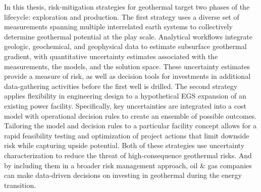 In this thesis, risk-mitigation strategies for geothermal target two phases of the lifecycle: exploration and production. The first strategy uses a diverse set of measurements spanning multiple interrelated earth systems to collectively determine geothermal potential at the play scale. Analytical workflows integrate geologic, geochemical, and geophysical data to estimate subsurface geothermal gradient, with quantitative uncertainty estimates associated with the measurements, the models, and the solution space. These uncertainty estimates provide a measure of risk, as well as decision tools for investments in additional data-gathering activities before the first well is drilled. The second strategy applies flexibility in engineering design to a hypothetical EGS expansion of an existing power facility. Specifically, key uncertainties are integrated into a cost model with operational decision rules to create an ensemble of possible outcomes. Tailoring the model and decision rules to a particular facility concept allows for a rapid feasibility testing and optimization of project actions that limit downside risk while capturing upside potential. Both of these strategies use uncertainty characterization to reduce the threat of high-consequence geothermal risks. And by including them in a broader risk management approach, oil \& gas companies can make data-driven decisions on investing in geothermal during the energy transition.